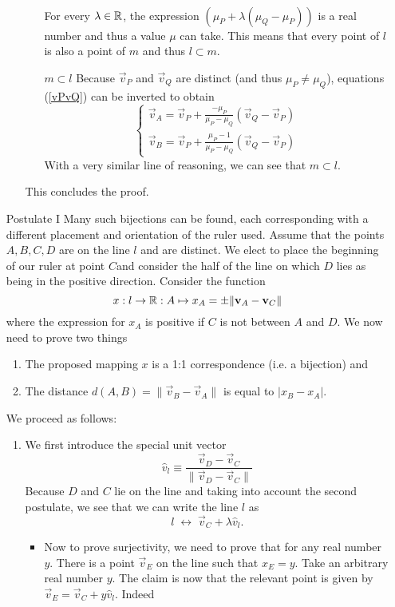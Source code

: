 \begin{enumerate}
\begin{enumerate}
\begin{enumerate}
\begin{align}
\end{align}
For every $\lambda \in \mathbb{R}$, the expression $(\mu_P + \lambda(\mu_Q - \mu_P))$ is a real number and thus a value $\mu$ can take. This means that every point of $l$ is also a point of $m$ and thus $l \subset m$.
\item[$\boxed{m \subset l}$] Because $\vec{v}_P$ and $\vec{v}_Q$ are distinct (and thus $\mu_P \neq \mu_Q$), equations (\ref{vPvQ}) can be inverted to obtain
\[ \begin{cases}
\vec{v}_A = \vec{v}_P + \frac{-\mu_P}{\mu_P - \mu_Q}(\vec{v}_Q - \vec{v}_P) \\
\vec{v}_B = \vec{v}_P + \frac{\mu_P-1}{\mu_P - \mu_Q}(\vec{v}_Q - \vec{v}_P)
\end{cases} \]
With a very similar line of reasoning, we can see that $m \subset l$.
\end{enumerate}
This concludes the proof.
\end{enumerate}
\item[Postulate I] Many such bijections can be found, each corresponding with a different placement and orientation of the ruler used. Assume that the points $A,B,C,D$ are on the line $l$ and are distinct. We elect to place the beginning of our ruler at point $C$and consider the half of the line on which $D$ lies as being in the positive direction. Consider the function
\[ x: l\to \mathbb{R}: A \mapsto x_A = \pm\lVert \bm{\mathrm{v}}_A - \bm{\mathrm{v}}_C \lVert \]
where the expression for $x_A$ is positive if $C$ is not between $A$ and $D$. We now need to prove two things
\begin{enumerate}
\item The proposed mapping $x$ is a 1:1 correspondence (i.e. a bijection) and
\item The distance $d(A,B) = \lVert \vec{v}_B - \vec{v}_A\lVert$ is equal to $|x_B - x_A|$.
\end{enumerate}
We proceed as follows:
\begin{enumerate}
\item We first introduce the special unit vector 
\[ \hat{v}_l \equiv \frac{\vec{v}_D - \vec{v}_C}{\lVert \vec{v}_D - \vec{v}_C\lVert} \]
Because $D$ and $C$ lie on the line and taking into account the second postulate, we see that we can write the line $l$ as
\[ l \;\leftrightarrow\; \vec{v}_C + \lambda \hat{v}_l. \]
\begin{itemize}
\item Now to prove surjectivity, we need to prove that for any real number $y$. There is a point $\vec{v}_E$ on the line such that $x_E = y$. Take an arbitrary real number $y$. The claim is now that the relevant point is given by $\vec{v}_E = \vec{v}_C + y \hat{v}_l$. Indeed

\end{itemize}
\end{enumerate}
\end{enumerate}
